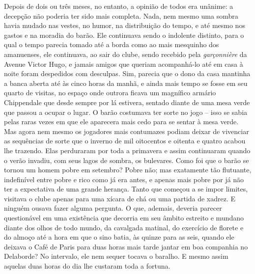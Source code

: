 Depois de dois ou três meses, no entanto, a opinião de todos era
unânime: a decepção não poderia ter sido mais completa. Nada, nem mesmo
uma sombra havia mudado nas vestes, no humor, na distribuição do tempo,
e até mesmo nos gastos e na moradia do barão. Ele continuava sendo o
indolente distinto, para o qual o tempo parecia tomado até a borda como
ao mais mesquinho dos amanuenses, ele continuava, ao sair do clube,
sendo recebido pela \emph{garçonnière} da Avenue Victor Hugo, e jamais
amigos que queriam acompanhá-lo até em casa à noite foram despedidos com
desculpas. Sim, parecia que o dono da casa mantinha a banca aberta até
às cinco horas da manhã, e ainda mais tempo se fosse em seu quarto de
visitas, no espaço onde outrora ficava um magnífico armário Chippendale
que desde sempre por lá estivera, sentado diante de uma mesa verde que
passou a ocupar o lugar. O barão costumava ter sorte no jogo -- isso se
sabia pelas raras vezes em que ele aparecera mais cedo para se sentar à
mesa verde. Mas agora nem mesmo os jogadores mais contumazes podiam
deixar de vivenciar as sequências de sorte que o inverno de mil
oitocentos e oitenta e quatro acabou lhe trazendo. Elas perduraram por
toda a primavera e assim continuaram quando o verão invadiu, com seus
lagos de sombra, os bulevares. Como foi que o barão se tornou um homem
pobre em setembro? Pobre não; mas exatamente tão flutuante, indefinível
entre pobre e rico como já era antes, e apenas mais pobre por já não ter
a expectativa de uma grande herança. Tanto que começou a se impor
limites, visitava o clube apenas para uma xícara de chá ou uma partida
de xadrez. E ninguém ousava fazer alguma pergunta. O que, ademais,
deveria parecer questionável em uma existência que decorria em seu
âmbito estreito e mundano diante dos olhos de todo mundo, da cavalgada
matinal, do exercício de florete e do almoço até a hora em que o sino
batia, às quinze para as seis, quando ele deixava o Café de Paris para
duas horas mais tarde jantar em boa companhia no Delaborde? No
intervalo, ele nem sequer tocava o baralho. E mesmo assim aquelas duas
horas do dia lhe custaram toda a fortuna.

